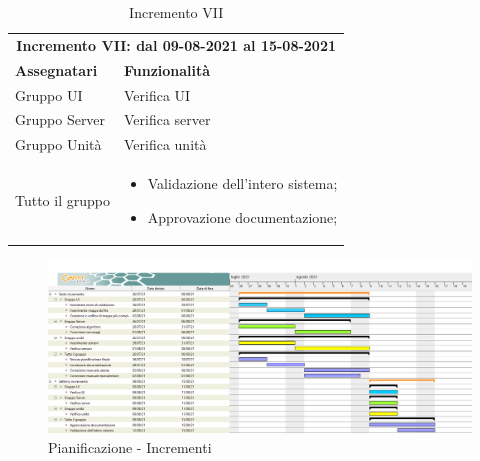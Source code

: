 \clearpage

\begin{table} [h!]
	\begin{center}
		\begin{tabular} { m{4cm}  m{11cm}  }	
			\multicolumn{2}{c}{	\textbf{Incremento VII: dal 09-08-2021 al 15-08-2021}} \\
			\rowcolor{lightgray}
			\textbf{Assegnatari} & \textbf{Funzionalità} \\
			Gruppo UI & Verifica UI \\	
			Gruppo Server & Verifica server \\	
			Gruppo Unità &  Verifica unità \\
			Tutto il gruppo &  \begin{itemize}
				\item Validazione dell'intero sistema;
				\item Approvazione documentazione;
			\end{itemize}\\			
			
		\end{tabular}
		\caption{Incremento VII}
	\end{center}
\end{table}

\newpage
\begin{landscape}
	\begin{figure}[h!]
		\includegraphics[width=24cm]{images/inc 6e7}
		\caption{Pianificazione - Incrementi}
	\end{figure}
\end{landscape}